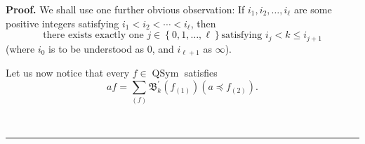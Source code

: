 \documentclass
[numbers=enddot,12pt,final,onecolumn,notitlepage,abstracton]{scrartcl}%
\theoremstyle{definition}
\newenvironment{proof}[1][Proof]{\noindent\textbf{#1.} }{\ \rule{0.5em}{0.5em}}
\newenvironment{verlong}{}{}
\let\sumnonlimits\sum
\renewcommand{\sum}{\sumnonlimits\limits}
\begin{document}
\begin{verlong}
\begin{proof}
We shall use one further obvious observation: If $i_{1},i_{2},\ldots,i_{\ell}$
are some positive integers satisfying $i_{1}<i_{2}<\cdots<i_{\ell}$, then%
\begin{equation}
\text{there exists exactly one }j\in\left\{  0,1,\ldots,\ell\right\}  \text{
satisfying }i_{j}<k\leq i_{j+1} \label{pf.thm.tvidend.exactlyonej}%
\end{equation}
(where $i_{0}$ is to be understood as $0$, and $i_{\ell+1}$ as $\infty$).

Let us now notice that every $f\in\operatorname*{QSym}$ satisfies%
\begin{equation}
af=\sum_{\left(  f\right)  }\mathfrak{B}_{k}^{\prime}\left(  f_{\left(
1\right)  }\right)  \left(  a\left.  \preceq\right.  f_{\left(  2\right)
}\right)  . \label{pf.thm.tvidend.mainlem}%
\end{equation}



\end{proof}
\end{verlong}
\end{document}
